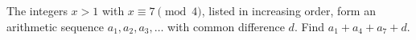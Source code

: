 The integers $x>1$ with $x\equiv7\pmod4$, listed in increasing order, form an arithmetic sequence $a_1,a_2,a_3,\dots$ with common difference $d$. Find $a_1+a_4+a_7+d$.
